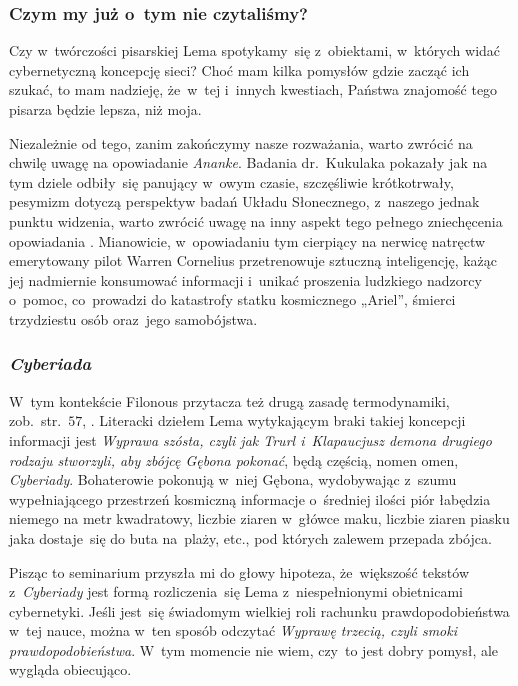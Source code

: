 \documentclass[10pt,t]{beamer}
\begin{document}
\begin{frame}
  \frametitle{Czym my już o~tym nie czytaliśmy?}


  Czy w~twórczości pisarskiej Lema spotykamy~się z~obiektami, w~których
  widać cybernetyczną koncepcję sieci? Choć mam kilka pomysłów gdzie zacząć
  ich szukać, to mam nadzieję, że~w~tej i~innych kwestiach, Państwa
  znajomość tego pisarza będzie lepsza, niż moja.

  Niezależnie od tego, zanim zakończymy nasze rozważania, warto zwrócić na
  chwilę uwagę na opowiadanie \textit{Ananke}. Badania dr.~Kukulaka
  pokazały jak na tym dziele odbiły~się panujący w~owym czasie, szczęśliwie
  krótkotrwały, pesymizm dotyczą perspektyw badań Układu Słonecznego,
  z~naszego jednak punktu widzenia, warto zwrócić uwagę na inny aspekt tego
  pełnego zniechęcenia opowiadania
  \parencite{Kukulak-Two-Faces-of-Mars-Pub-2023}. Mianowicie, w~opowiadaniu
  tym cierpiący na nerwicę natręctw emerytowany pilot Warren Cornelius
  przetrenowuje sztuczną inteligencję, każąc jej
  nadmiernie konsumować informacji i~unikać proszenia ludzkiego nadzorcy
  o~pomoc, co~prowadzi do katastrofy statku kosmicznego „Ariel”, śmierci
  trzydziestu osób oraz~jego samobójstwa.

\end{frame}








\begin{frame}
  \frametitle{\textit{Cyberiada}}


  W~tym kontekście Filonous przytacza też drugą zasadę termodynamiki,
  zob.~str.~$57$, \parencite{Lem-Dialogi-Vol-I-Pub-1996}. Literacki
  dziełem Lema wytykającym braki takiej koncepcji informacji jest
  \textit{Wyprawa szósta, czyli jak Trurl i~Klapaucjusz demona drugiego
    rodzaju stworzyli, aby zbójcę Gębona pokonać}, będą częścią,
  nomen omen, \textit{Cyberiady}. Bohaterowie pokonują w~niej Gębona,
  wydobywając z~szumu wypełniającego przestrzeń kosmiczną informacje
  o~średniej ilości piór łabędzia niemego na metr kwadratowy, liczbie
  ziaren w~główce maku, liczbie ziaren piasku jaka dostaje~się do buta
  na~plaży, etc., pod których zalewem przepada zbójca.


  Pisząc to seminarium przyszła mi do głowy hipoteza, że~większość tekstów
  z~\textit{Cyberiady} jest formą rozliczenia~się Lema z~niespełnionymi
  obietnicami cybernetyki. Jeśli jest~się świadomym wielkiej roli
  rachunku prawdopodobieństwa w~tej nauce, można w~ten sposób odczytać
  \textit{Wyprawę trzecią, czyli smoki prawdopodobieństwa}. W~tym momencie
  nie wiem, czy~to jest dobry pomysł, ale wygląda obiecująco.

\end{frame}
\end{document}

